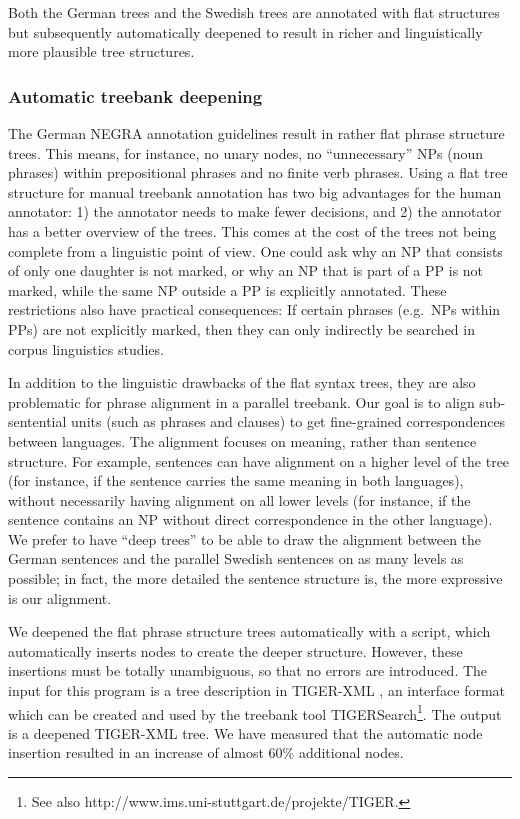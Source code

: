 \documentclass[output=paper]{LSP/langsci}
\begin{document}
Both the German trees and the Swedish trees are annotated with flat structures but subsequently automatically deepened to result in richer and linguistically more plausible tree structures. 

\subsubsection{Automatic treebank deepening}\label{sec:volk:2.1.1}

The German NEGRA annotation guidelines \citep{BrantsEtAl1997} result in rather flat phrase structure trees. This means, for instance, no unary nodes, no ``unnecessary'' NPs (noun phrases) within prepositional phrases and no finite verb phrases. Using a flat tree structure for manual treebank annotation has two big advantages for the human annotator: 1) the annotator needs to make fewer decisions, and 2) the annotator has a better overview of the trees. This comes at the cost of the trees not being complete from a linguistic point of view. One could ask why an NP that consists of only one daughter is not marked, or why an NP that is part of a PP is not marked, while the same NP outside a PP is explicitly annotated. These restrictions also have practical consequences: If certain phrases (e.g.~NPs within PPs) are not explicitly marked, then they can only indirectly be searched in corpus linguistics studies. 

In addition to the linguistic drawbacks of the flat syntax trees, they are also problematic for phrase alignment in a parallel treebank. Our goal is to align sub-sentential units (such as phrases and clauses) to get fine-grained correspondences between languages. The alignment focuses on meaning, rather than sentence structure. For example, sentences can have alignment on a higher level of the tree (for instance, if the sentence carries the same meaning in both languages), without necessarily having alignment on all lower levels (for instance, if the sentence contains an NP without direct correspondence in the other language). We prefer to have ``deep trees'' to be able to draw the alignment between the German sentences and the parallel Swedish sentences on as many levels as possible; in fact, the more detailed the sentence structure is, the more expressive is our alignment. 

We deepened the flat phrase structure trees automatically with a script, which automatically inserts nodes to create the deeper structure. However, these insertions must be totally unambiguous, so that no errors are introduced. The input for this program is a tree description in TIGER-XML \citep{König2002}, an interface format which can be created and used by the treebank tool TIGERSearch\footnote{See also http://www.ims.uni-stuttgart.de/projekte/TIGER.}. The output is a deepened TIGER-XML tree. We have measured that the automatic node insertion resulted in an increase of almost 60\% additional nodes. 
\end{document}
